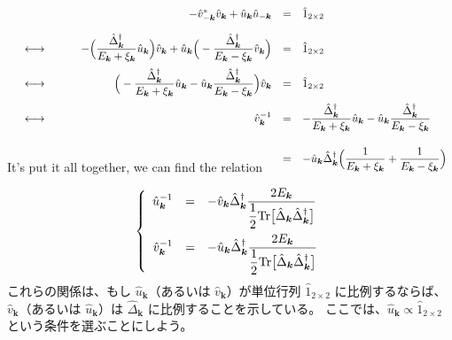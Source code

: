 \documentclass[uplatex,a4j,12pt,dvipdfmx]{jsarticle}
\begin{document}
	\begin{eqnarray}
		\begin{array}{rcrcl}
			 &   &
			- \hat{v}_{-\bm{k}}^{*} \hat{v}_{\bm{k}} + \hat{u}_{\bm{k}} \hat{u}_{-\bm{k}}
			 & = &
			\hat{1}_{2 \times 2}
			\nonumber \\[4mm] &\longleftrightarrow& \hspace{8mm}
			- \Big( \dfrac{ \hat{\Delta}^{\dagger}_{\bm{k}} }{ E_{\bm{k}} + \xi_{\bm{k}} } \hat{u}_{\bm{k}} \Big)
			\hat{v}_{\bm{k}}
			+
			\hat{u}_{\bm{k}}
			\Big( - \dfrac{ \hat{\Delta}^{\dagger}_{\bm{k}} }{ E_{\bm{k}} - \xi_{\bm{k}} } \hat{v}_{\bm{k}} \Big)
			 & = &
			\hat{1}_{2 \times 2}
			\nonumber \\[4mm] &\longleftrightarrow& \hspace{8mm}
			\Big( - \dfrac{ \hat{\Delta}^{\dagger}_{\bm{k}} }{ E_{\bm{k}} + \xi_{\bm{k}} } \hat{u}_{\bm{k}}
			-
			\hat{u}_{\bm{k}}
			\dfrac{ \hat{\Delta}^{\dagger}_{\bm{k}} }{ E_{\bm{k}} - \xi_{\bm{k}} } \Big)
			\hat{v}_{\bm{k}}
			 & = &
			\hat{1}_{2 \times 2}
			\nonumber \\[4mm] &\longleftrightarrow& \hspace{8mm}
			{\hat{v}_{\bm{k}}}^{-1}
			 & = &
			- \dfrac{ \hat{\Delta}^{\dagger}_{\bm{k}} }{ E_{\bm{k}} + \xi_{\bm{k}} } \hat{u}_{\bm{k}}
			-
			\hat{u}_{\bm{k}}
			\dfrac{ \hat{\Delta}^{\dagger}_{\bm{k}} }{ E_{\bm{k}} - \xi_{\bm{k}} }
			\nonumber \\[7mm] &&
			 & = &
			- \hat{u}_{\bm{k}} \hat{\Delta}^{\dagger}_{\bm{k}}
			\Big(
			\dfrac{ 1 }{ E_{\bm{k}} + \xi_{\bm{k}} }
			+
			\dfrac{ 1 }{ E_{\bm{k}} - \xi_{\bm{k}} }
			\Big)
		\end{array}
		\\[-7mm]
	\end{eqnarray}
	It's put it all together, we can find the relation

	\begin{eqnarray}
		\left\{
		\begin{array}{rcl}
			{\hat{u}_{\bm{k}}}^{-1}
			 & = &
			- \hat{v}_{\bm{k}} \hat{\Delta}^{\dagger}_{\bm{k}}
			\dfrac{ 2 E_{\bm{k}} }{ \dfrac{1}{2} {\rm Tr} \big[ \hat{\Delta}_{\bm{k}} \hat{\Delta}^{\dagger}_{\bm{k}} \big] }
			\\[7mm]
			{\hat{v}_{\bm{k}}}^{-1}
			 & = &
			- \hat{u}_{\bm{k}} \hat{\Delta}^{\dagger}_{\bm{k}}
			\dfrac{ 2 E_{\bm{k}} }{ \dfrac{1}{2} {\rm Tr} \big[ \hat{\Delta}_{\bm{k}} \hat{\Delta}^{\dagger}_{\bm{k}} \big] }
		\end{array}
		\right.
	\end{eqnarray}
\fi
これらの関係は、もし $\hat{u}_{\bm{k}}$（あるいは $\hat{v}_{\bm{k}}$）が単位行列 $\hat{1}_{2 \times 2}$ に比例するならば、
$\hat{v}_{\bm{k}}$（あるいは $\hat{u}_{\bm{k}}$）は $\hat{\Delta}_{\bm{k}}$ に比例することを示している。
ここでは、$\hat{u}_{\bm{k}} \propto \hat{1}_{2 \times 2}$ という条件を選ぶことにしよう。
\end{document}
